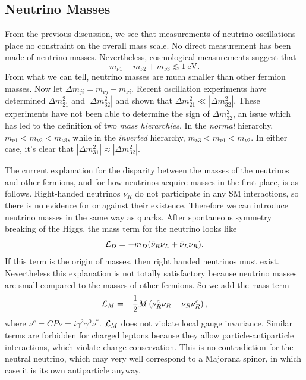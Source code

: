 \subsection{Neutrino Masses}
From the previous discussion, we see that measurements of neutrino oscillations
place no constraint on the overall mass scale. No direct measurement has been
made of neutrino masses. Nevertheless, cosmological measurements suggest
that \cite{thomson_modern_2013}
\begin{equation}
  m_{\nu1}+m_{\nu2}+m_{\nu3}\lesssim1~\text{eV}. 
\end{equation}
From what we can tell,
neutrino masses are much smaller than other fermion masses. Now let
$\Delta m_{ji}=m_{\nu j}-m_{\nu i}$.
Recent oscillation experiments have determined $\Delta m_{21}^2$ and
$|\Delta m_{32}^2|$ and shown that $\Delta m_{21}^2\ll|\Delta m_{32}^2|$.
These experiments have not been able to determine the sign of
$\Delta m_{32}^2$, an issue which has led to the definition of two {\it mass
hierarchies}. 
In the {\it normal} hierarchy, $m_{\nu1}<m_{\nu2}<m_{\nu3}$,
while in the {\it inverted} hierarchy, $m_{\nu3}<m_{\nu1}<m_{\nu2}$. In
either case, it's clear that $|\Delta m_{31}^2|\approx|\Delta m_{32}^2|$.

The current explanation for the disparity between the masses of the neutrinos
and other fermions, and for how neutrinos acquire masses in the
first place, is as follows. Right-handed neutrinos $\nu_R$ do not
participate in any SM interactions, so
there is no evidence for or against their existence. Therefore we can introduce
neutrino masses in the same way as quarks. After spontaneous symmetry breaking
of the Higgs, the mass term for the neutrino looks like
\begin{equation}
  \mathcal{L}_D=-m_D(\bar{\nu}_R\nu_L+\bar{\nu}_L\nu_R).
\end{equation}
If this term is the origin of masses, then right handed neutrinos must exist.
Nevertheless this explanation is not totally satisfactory because neutrino
masses are small compared to the masses of other fermions. So we add
the mass term
\begin{equation}
  \mathcal{L}_M=-\frac{1}{2}M\left(\bar{\nu}^c_R\nu_R+\bar{\nu}_R\nu^c_R\right),
\end{equation}
where $\nu^c=CP\nu=i\gamma^2\gamma^0\nu^*$. $\mathcal{L}_M$ does not violate local
gauge invariance. Similar terms are forbidden for charged leptons because
they allow particle-antiparticle interactions, which violate charge
conservation. This is no contradiction for the neutral neutrino, which may
very well correspond to a Majorana spinor, in which case it is its own
antiparticle anyway.

